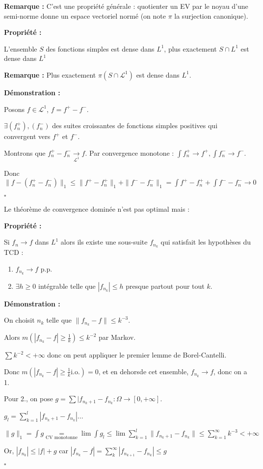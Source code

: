 \documentclass[10pt,a4paper,notitlepage ]{report}
\newcommand{\1}{\mathds 1}
\newcommand{\LL}{\mathcal L}
\newcounter{th}
\newenvironment{propriete}[1][]{
	\begin{tcolorbox}
		\textbf{Propriété #1 : }
}
{\end{tcolorbox}}
\newenvironment{demo}[1][]{

	\textbf{Démonstration #1 :}
}{\begin{flushright}
	$\square$
\end{flushright}
}
\newenvironment{rem}{
	
		\textbf{Remarque :}}{}
\begin{document}
\begin{rem}
	C'est une propriété générale : quotienter un EV par le noyau d'une semi-norme donne un espace vectoriel normé (on note $\pi$ la surjection canonique).
\end{rem}

\begin{propriete}
	L'ensemble $S$ des fonctions simples est dense dans $L^1$, plus exactement $S\cap L^1$ est dense dans $L^1$
\end{propriete}

\begin{rem}
	Plus exactement $\pi(S\cap\LL^1)$ est dense dans $L^1$.
\end{rem}

\begin{demo}
	Posons $f\in \LL^1$, $f=f^+ - f^-$.
	
	$\exists(f_n^+),(f_n^-)$ des suites croissantes de fonctions simples positives qui convergent vers $f^+$ et $f^-$.
	
	Montrons que $f_n^+-f_n^- \underset{\LL^1}{\rightarrow} f$. Par convergence monotone : $\int f_n^+ \rightarrow f^+, \int f_n^- \rightarrow f^-$.
	
	Donc $\|f-(f_n^+-f_n^-)\|_1 \le \|f^+-f_n^+\|_1 + \|f^- - f_n^-\|_1 = \int f^+ - f_n^+ + \int f^--f_n^-  \rightarrow 0$ 
\end{demo}

Le théorème de convergence dominée n'est pas optimal mais :

\begin{propriete}
	Si $f_n \rightarrow f$ dans $L^1$ alors ils existe une sous-suite $f_{n_k}$ qui satisfait les hypothèses du TCD : 
	\begin{enumerate}
		\item $f_{n_k} \rightarrow f$ p.p.
		\item $\exists h \ge 0$ intégrable telle que $|f_{n_k}| \le h$ presque partout pour tout $k$.
	\end{enumerate}
\end{propriete}

\begin{demo}
	On choisit $n_k$ telle que $\|f_{n_k}-f\| \le k^{-3}$.
	
	Alors $m(|f_{n_k}-f| \ge \frac 1 k) \le k ^{-2}$ par Markov.
	
	$\sum k^{-2} < +\infty$ donc on peut appliquer le premier lemme de Borel-Cantelli.
	
	Donc $m(|f_{n_k}-f| \ge \frac 1 k \text{i.o.}) = 0$, et en dehorsde cet ensemble, $f_{n_k} \rightarrow f$, donc on a 1.
	
	Pour 2., on pose $g = \sum |f_{n_k + 1} - f_{n_k} : \Omega \rightarrow [0,+\infty]$.
	
	$g_l = \sum_{k=1}^l |f_{n_k+1} - f_{n_k}| ...$ %
	
	$\|g\|_1 = \int g \underset{\text{CV monotonne}} = \lim \int g_l \le \lim \sum_{k=1}^l \|f_{n_k+1} - f_{n_k}\| \le \sum_{k=1}^\infty k^{-3} < +\infty$
	
	Or, $|f_{n_k}| \le |f| + g$ car $|f_{n_k} - f| = \sum_k^\infty|f_{n_{k+1}} - f_{n_k}| \le g$
\end{demo}
\end{document}
